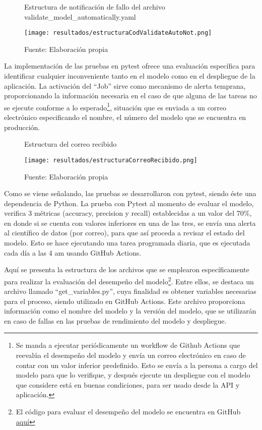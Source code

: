 \newpage

\begin{figure}[h]
	\centering
	\caption{Estructura de notificación de fallo del archivo validate\_model\_automatically.yaml}
	\texttt{[image: resultados/estructuraCodValidateAutoNot.png]}
	\caption*{\footnotesize Fuente: Elaboración propia}
	\label{fig:figuraEstructuraCodValidateAutoNot}
\end{figure}

La implementación de las pruebas en pytest ofrece una evaluación específica para identificar cualquier inconveniente tanto en el modelo como en el despliegue de la aplicación. La activación del ``Job'' sirve como mecanismo de alerta temprana, proporcionando la información necesaria en el caso de que alguna de las tareas no se ejecute conforme a lo esperado\footnote{Se manda a ejecutar periódicamente un workflow de Github Actions que reevalúa el desempeño del modelo y envía un correo electrónico en caso de contar con un valor inferior predefinido. Esto se envía a la persona a cargo del modelo para que lo verifique, y después ejecute un despliegue con el modelo que considere está en buenas condiciones, para ser usado desde la API y aplicación.}, situación que es enviada a un correo electrónico especificando el nombre, el número del modelo que se encuentra en producción.

\newpage

\begin{figure}[h]
	\centering
	\caption{Estructura del correo recibido}
	\texttt{[image: resultados/estructuraCorreoRecibido.png]}
	\caption*{\footnotesize Fuente: Elaboración propia}
	\label{fig:figuraEstructuraCorreoRecibido}
\end{figure}


Como se viene señalando, las pruebas se desarrollaron con pytest, siendo éste una dependencia de Python. La prueba con Pytest al momento de evaluar el modelo, verifica 3 métricas (accuracy, precision y recall) establecidas a un valor del 70\%, en donde si se cuenta con valores inferiores en una de las tres, se envía una alerta al científico de datos (por correo), para que así proceda a revisar el estado del modelo. Esto se hace ejecutando una tarea programada diaria, que es ejecutada cada día a las 4 am usando GitHub Actions. 

\newpage

Aquí se presenta la estructura de los archivos que se emplearon específicamente para realizar la evaluación del desempeño del modelo\footnote{El código para evaluar el desempeño del modelo se encuentra en GitHub \href{https://github.com/juferoto/mlops_project/tree/master/training/tests}{aquí}}. Entre ellos, se destaca un archivo llamado ``get\_variables.py'', cuya finalidad es obtener variables necesarias para el proceso, siendo utilizado en GitHub Actions. Este archivo proporciona información como el nombre del modelo y la versión del modelo, que se utilizarán en caso de fallas en las pruebas de rendimiento del modelo y despliegue.


